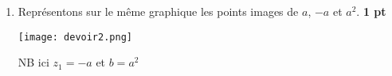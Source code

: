 \documentclass[12pt,a4paper]{article}
\begin{document}
\begin{enumerate}
    \[\boxed{\textcolor{green}{\begin{cases}
	    \cos\left(\frac{7\pi}{12}\right)=-\frac{\sqrt{2 - \sqrt{3}}}{2}\\
	    \sin\left(\frac{7\pi}{12}\right)=\frac{\sqrt{2 + \sqrt{3}}}{2}
	    \end{cases}}}\]

    Puis les valeurs exactes de $\cos\left(\frac{\pi}{12}\right)$ et $\sin\left(\frac{\pi}{12}\right)$. \hfill \textbf{0,5 pt}
	     
	Or $\frac{7\pi}{12}=\frac{6\pi+\pi}{12}=\frac{\pi}{12}+\frac{\pi}{2}$
	
	  donc  $
		\begin{cases}
	    \cos\left(\frac{7\pi}{12}\right)=-\frac{\sqrt{2 - \sqrt{3}}}{2}\\
	    \sin\left(\frac{7\pi}{12}\right)=\frac{\sqrt{2 + \sqrt{3}}}{2}
	    \end{cases}\implies
	    \begin{cases}
	    \cos\left(\frac{\pi}{12}+\frac{\pi}{2}\right)=-\frac{\sqrt{2 - \sqrt{3}}}{2}\\
	    \sin\left(\frac{\pi}{12}+\frac{\pi}{2}\right)=\frac{\sqrt{2 + \sqrt{3}}}{2}
	    \end{cases}
	    $
	    
		$
		\begin{cases}
	    -\sin\left(\frac{\pi}{12}\right)=-\frac{\sqrt{2 - \sqrt{3}}}{2}\\
	    \cos\left(\frac{\pi}{12}\right)=\frac{\sqrt{2 + \sqrt{3}}}{2}
	    \end{cases}\implies
	   	\begin{cases}
	    \sin\left(\frac{\pi}{12}\right)=\frac{\sqrt{2 - \sqrt{3}}}{2}\\
	    \cos\left(\frac{\pi}{12}\right)=\frac{\sqrt{2 + \sqrt{3}}}{2}
	    \end{cases}
	    $
	    
    \[\boxed{\textcolor{green}{\begin{cases}
	    \cos\left(\frac{\pi}{12}\right)=\frac{\sqrt{2 + \sqrt{3}}}{2}\\
	    \sin\left(\frac{\pi}{12}\right)=\frac{\sqrt{2 - \sqrt{3}}}{2}
	    \end{cases}}}\]    \hfill \textbf{0,5 pt}
    \item Représentons sur le même graphique les points images de $a$, $-a$ et $a^2$. \hfill \textbf{1 pt}
    
    \begin{center}
    \texttt{[image: devoir2.png]}
\end{center}

NB ici $z_{1}=-a$ et $b=a^{2}$
\end{enumerate}
\end{document}
